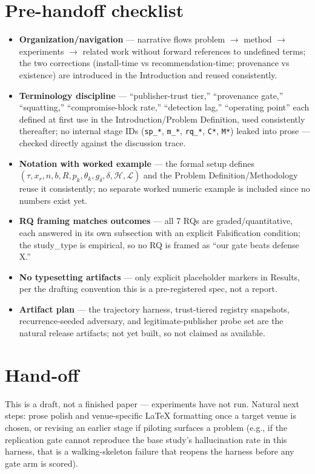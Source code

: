 \documentclass[11pt]{article}
\begin{document}
\section*{Pre-handoff checklist}
\begin{itemize}[leftmargin=1.4em]
\item \textbf{Organization/navigation} --- narrative flows problem $\to$ method $\to$ experiments $\to$ related work without forward references to undefined terms; the two corrections (install-time vs recommendation-time; provenance vs existence) are introduced in the Introduction and reused consistently.
\item \textbf{Terminology discipline} --- ``publisher-trust tier,'' ``provenance gate,'' ``squatting,'' ``compromise-block rate,'' ``detection lag,'' ``operating point'' each defined at first use in the Introduction/Problem Definition, used consistently thereafter; no internal stage IDs (\texttt{sp\_*}, \texttt{m\_*}, \texttt{rq\_*}, \texttt{C*}, \texttt{M*}) leaked into prose --- checked directly against the discussion trace.
\item \textbf{Notation with worked example} --- the formal setup defines $(\tau, x_r, n, b, R, p_k, \theta_k, g_\delta, \delta, \mathcal{H}, \mathcal{L})$ and the Problem Definition/Methodology reuse it consistently; no separate worked numeric example is included since no numbers exist yet.
\item \textbf{RQ framing matches outcomes} --- all 7 RQs are graded/quantitative, each answered in its own subsection with an explicit Falsification condition; the study\_type is empirical, so no RQ is framed as ``our gate beats defense X.''
\item \textbf{No typesetting artifacts} --- only explicit placeholder markers in Results, per the drafting convention this is a pre-registered spec, not a report.
\item \textbf{Artifact plan} --- the trajectory harness, trust-tiered registry snapshots, recurrence-seeded adversary, and legitimate-publisher probe set are the natural release artifacts; not yet built, so not claimed as available.
\end{itemize}

\section*{Hand-off}
This is a draft, not a finished paper --- experiments have not run. Natural next steps: prose polish and venue-specific LaTeX formatting once a target venue is chosen, or revising an earlier stage if piloting surfaces a problem (e.g., if the replication gate cannot reproduce the base study's hallucination rate in this harness, that is a walking-skeleton failure that reopens the harness before any gate arm is scored).
\end{document}
